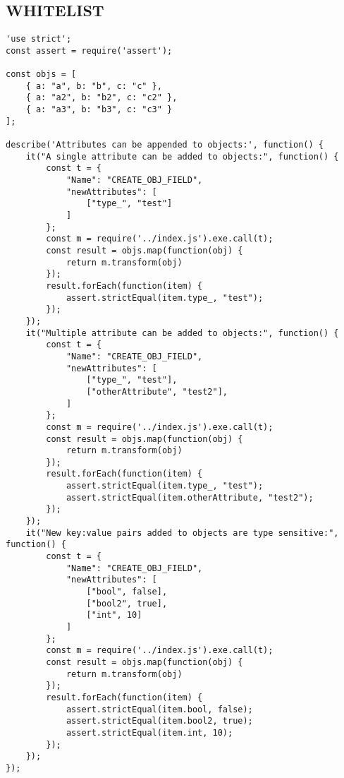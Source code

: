 \subsection{WHITELIST}
\label{WHITELIST-tests}
\begin{verbatim}
'use strict';
const assert = require('assert');

const objs = [
    { a: "a", b: "b", c: "c" },
    { a: "a2", b: "b2", c: "c2" },
    { a: "a3", b: "b3", c: "c3" }
];

describe('Attributes can be appended to objects:', function() {
    it("A single attribute can be added to objects:", function() {
        const t = {
            "Name": "CREATE_OBJ_FIELD",
            "newAttributes": [
                ["type_", "test"]
            ]
        };
        const m = require('../index.js').exe.call(t);
        const result = objs.map(function(obj) {
            return m.transform(obj)
        });
        result.forEach(function(item) {
            assert.strictEqual(item.type_, "test");
        });
    });
    it("Multiple attribute can be added to objects:", function() {
        const t = {
            "Name": "CREATE_OBJ_FIELD",
            "newAttributes": [
                ["type_", "test"],
                ["otherAttribute", "test2"],
            ]
        };
        const m = require('../index.js').exe.call(t);
        const result = objs.map(function(obj) {
            return m.transform(obj)
        });
        result.forEach(function(item) {
            assert.strictEqual(item.type_, "test");
            assert.strictEqual(item.otherAttribute, "test2");
        });
    });
    it("New key:value pairs added to objects are type sensitive:", function() {
        const t = {
            "Name": "CREATE_OBJ_FIELD",
            "newAttributes": [
                ["bool", false],
                ["bool2", true],
                ["int", 10]
            ]
        };
        const m = require('../index.js').exe.call(t);
        const result = objs.map(function(obj) {
            return m.transform(obj)
        });
        result.forEach(function(item) {
            assert.strictEqual(item.bool, false);
            assert.strictEqual(item.bool2, true);
            assert.strictEqual(item.int, 10);
        });
    });
});
\end{verbatim}